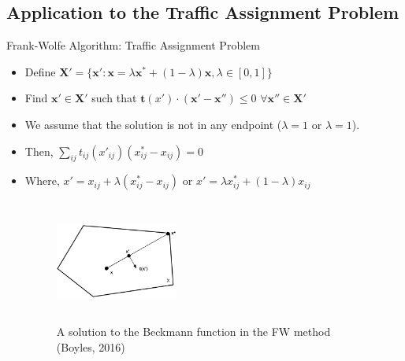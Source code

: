 \documentclass{beamer}
\newcommand{\vect}[1]{\boldsymbol{#1}}
\begin{document}
\subsection{Application to the Traffic Assignment Problem}
\begin{frame}{Frank-Wolfe Algorithm: Traffic Assignment Problem}
	\begin{itemize}
		\item  Define $\vect{X}'=\{\vect{x}':\vect{x}=\lambda \vect{x}^{*} + (1-\lambda)\vect{x}, \lambda \in [0,1] \}$
		\item Find $\vect{x}' \in \vect{X}' $ such that $\vect{t}(x')\cdot (\vect{x}'-\vect{x}'')\leq 0$  $\forall \vect{x}'' \in \vect{X}'$
		\item We assume that the solution is not in any endpoint ($\lambda=1$ or $\lambda=1$).
		\item   Then, $\sum_{ij}^{} t_{ij}(x'_{ij})(x_{ij}^{*}-x_{ij})=0$
		\item Where, $x' = x_{ij} + \lambda(x_{ij}^{*}-x_{ij})$ or $x'=\lambda x_{ij}^{*}+(1-\lambda )x_{ij}$ 
	\begin{figure}
		\includegraphics[width=4cm, height=4cm]{Fig/FrankWolfeSol.png}
		\caption{A solution to the Beckmann function in the FW method (Boyles, 2016)}
	\end{figure}
	\end{itemize}
\end{frame}
\end{document}
